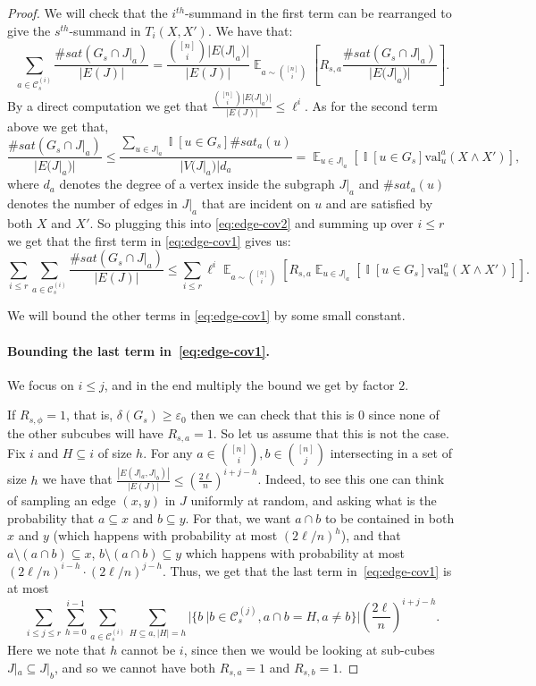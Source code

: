 \documentclass[11pt]{article}
\DeclareMathOperator*{\E}{\mathbb{E}}
\DeclareMathOperator*{\Ind}{\mathbb{I}}
\def \cC {\mathcal{C}}
\def \eps {{\varepsilon}}
\def \val {\mathrm{val}}
\theoremstyle{definition}
\begin{document}
\begin{proof}
We will check that the $i^{th}$-summand in the first term can be rearranged to give the $s^{th}$-summand in $T_i(X,X')$. We have that:
\begin{equation}\label{eq:edge-cov2}
\sum_{a \in \cC^{(i)}_s} \frac{\#sat(G_s \cap J|_a)}{|E(J)|} = \frac{{[n] \choose i}|E(J|_a)|}{|E(J)|}\E_{a \sim {[n] \choose i}}\left[R_{s,a}\frac{\#sat(G_s \cap J|_a)}{|E(J|_a)|}\right].
\end{equation}
By a direct computation we get that $\frac{{[n] \choose i}|E(J|_a)|}{|E(J)|} \leq \ell^i$. As for the second term above we get that, 
\begin{equation*}
\frac{\#sat(G_s \cap J|_a)}{|E(J|_a)|} \leq \frac{\sum_{u \in J|_a}\Ind[u \in G_s]\#sat_a(u)}{|V(J|_a)|d_a} = \E_{u \in J|_a}[\Ind[u \in G_s]\val_u^a(X \wedge X')],
\end{equation*}
where $d_a$ denotes the degree of a vertex inside the subgraph $J|_a$ and $\#sat_a(u)$ denotes the number of edges in $J|_a$ that are incident on $u$ and are satisfied by both $X$ and $X'$. So plugging this into \eqref{eq:edge-cov2} and summing up over $i \leq r$ we get that the first term in \eqref{eq:edge-cov1} gives us:
\begin{equation}\label{eq:first-term-ec}
\sum_{i \leq r} \sum_{a \in \cC^{(i)}_s} \frac{\#sat(G_s \cap J|_a)}{|E(J)|} \leq \sum_{i \leq r} \ell^i \E_{a \sim {[n] \choose i}}[R_{s,a}\E_{u \in J|_a}[\Ind[u \in G_s]\val_u^a(X \wedge X')]]. 
\end{equation}


We will bound the other terms in \eqref{eq:edge-cov1} by some small constant. 

\paragraph{Bounding the last term in~\eqref{eq:edge-cov1}.} 
We focus on $i\leq j$, and in the end multiply the 
bound we get by factor $2$. 

If $R_{s,\phi} = 1$, that is, $\delta(G_s) \geq \eps_0$ then we can check that this is $0$ since none of the other subcubes will have $R_{s,a} = 1$. So let us assume that this is not the case. 
Fix $i$ and $H\subseteq i$ of size $h$. For any $a \in {[n] \choose i}, b \in {[n] \choose j}$
intersecting in a set of size $h$ we have that
$\frac{|E(J|_a, J|_b)|}{|E(J)|} \leq \left(\frac{2\ell}{n}\right)^{i+j-h}$.
Indeed, to see this one can think of sampling an edge 
$(x,y)$ in $J$ uniformly at random, and asking what 
is the probability that $a\subseteq x$ and $b\subseteq y$. For that, we want $a\cap b$ to be contained in 
both $x$ and $y$ (which happens with probability at most $(2\ell/n)^h$), and that $a\setminus(a\cap b)\subseteq x$, $b\setminus(a\cap b)\subseteq y$
which happens with probability at most $(2\ell/n)^{i-h}\cdot (2\ell/n)^{j-h}$. 
Thus, 
we get that the last term in~\eqref{eq:edge-cov1}
is at most
\[
\sum_{i\leq j \leq r} 
\sum\limits_{h=0}^{i-1}
\sum_{a \in \cC^{(i)}_s}
\sum_{H\subseteq a, |H| = h}
|\{b~|b\in \cC^{(j)}_s, a\cap b = H, a\neq b\}|\left(\frac{2\ell}{n}\right)^{i+j-h}.
\]
Here we note that $h$ cannot be $i$, since then we 
would be looking at sub-cubes $J|_a\subseteq J|_b$, 
and so we cannot have both $R_{s,a} = 1$ and $R_{s,b}=1$.


\end{proof}
\end{document}
